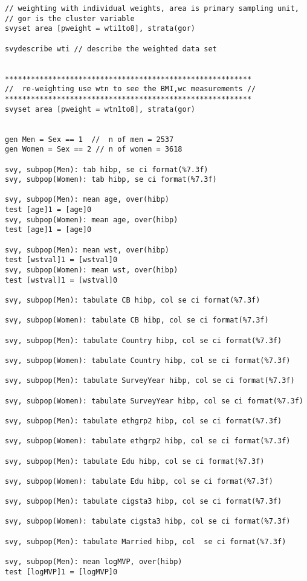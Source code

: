 \begin{verbatim}
// weighting with individual weights, area is primary sampling unit, 
// gor is the cluster variable
svyset area [pweight = wti1to8], strata(gor)

svydescribe wti // describe the weighted data set


*********************************************************
//  re-weighting use wtn to see the BMI,wc measurements //
*********************************************************
svyset area [pweight = wtn1to8], strata(gor)


gen Men = Sex == 1  //  n of men = 2537
gen Women = Sex == 2 // n of women = 3618

svy, subpop(Men): tab hibp, se ci format(%7.3f)
svy, subpop(Women): tab hibp, se ci format(%7.3f)

svy, subpop(Men): mean age, over(hibp)
test [age]1 = [age]0
svy, subpop(Women): mean age, over(hibp)
test [age]1 = [age]0

svy, subpop(Men): mean wst, over(hibp)
test [wstval]1 = [wstval]0
svy, subpop(Women): mean wst, over(hibp)
test [wstval]1 = [wstval]0

svy, subpop(Men): tabulate CB hibp, col se ci format(%7.3f)

svy, subpop(Women): tabulate CB hibp, col se ci format(%7.3f)

svy, subpop(Men): tabulate Country hibp, col se ci format(%7.3f)

svy, subpop(Women): tabulate Country hibp, col se ci format(%7.3f)

svy, subpop(Men): tabulate SurveyYear hibp, col se ci format(%7.3f)

svy, subpop(Women): tabulate SurveyYear hibp, col se ci format(%7.3f)

svy, subpop(Men): tabulate ethgrp2 hibp, col se ci format(%7.3f)

svy, subpop(Women): tabulate ethgrp2 hibp, col se ci format(%7.3f)

svy, subpop(Men): tabulate Edu hibp, col se ci format(%7.3f)

svy, subpop(Women): tabulate Edu hibp, col se ci format(%7.3f)

svy, subpop(Men): tabulate cigsta3 hibp, col se ci format(%7.3f)

svy, subpop(Women): tabulate cigsta3 hibp, col se ci format(%7.3f)

svy, subpop(Men): tabulate Married hibp, col  se ci format(%7.3f)

svy, subpop(Men): mean logMVP, over(hibp)
test [logMVP]1 = [logMVP]0


\end{verbatim}
